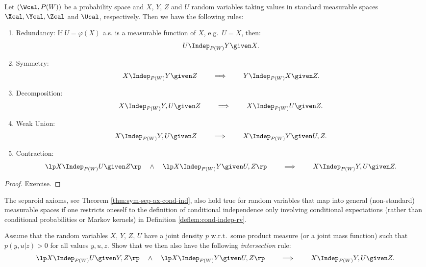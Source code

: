 \begin{Thm}
    \label{thm:sym-sep-ax-cond-ind}
  Let $(\Wcal,P(W))$ be a probability space and $X$, $Y$, $Z$ and $U$ random variables taking values in standard measurable spaces $\Xcal, \Ycal, \Zcal$ and $\Ucal$, respectively.
    Then we have the following rules:
    \begin{enumerate}
        \item Redundancy: If $U= \varphi(X)$ a.s. is a measurable function of $X$, e.g.\ $U=X$, then:
            \[ U \Indep_{P(W)} Y \given X. \]
        \item Symmetry: 
            \[ X \Indep_{P(W)} Y \given Z \qquad \implies \qquad Y \Indep_{P(W)} X \given Z.\]
        \item Decomposition: 
            \[X \Indep_{P(W)} Y,U \given Z \qquad \implies \qquad X \Indep_{P(W)} U \given Z.\]
        \item Weak Union:
            \[X \Indep_{P(W)} Y,U \given Z \qquad \implies \qquad X \Indep_{P(W)} Y \given U, Z.\]
        \item Contraction:
            \[ \lp X \Indep_{P(W)} U \given Z  \rp \quad \land \quad \lp X \Indep_{P(W)} Y \given U,Z  \rp \qquad \implies \qquad X \Indep_{P(W)} Y,U \given Z.  \]
    \end{enumerate}
    \begin{proof}
        Exercise. 
    \end{proof}
\end{Thm}

\begin{Rem}
    The separoid axioms, see Theorem \ref{thm:sym-sep-ax-cond-ind}, also hold true for random variables that map into general (non-standard) measurable spaces if 
    one restricts oneself to the definition of conditional independence only involving conditional expectations (rather than conditional probabilities or Markov kernels) in Definition \ref{deflem:cond-indep-rv}.
\end{Rem}

\begin{Exc}
    Assume that the random variables $X$, $Y$, $Z$, $U$ have a joint density $p$ w.r.t.\ some product measure (or a joint mass function)
    such that $p(y,u|z) > 0$ for all values $y,u,z$. Show that we then also have the following \emph{intersection} rule:
            \[ \lp X \Indep_{P(W)} U \given Y,Z  \rp \quad \land \quad \lp X \Indep_{P(W)} Y \given U,Z  \rp \qquad \implies \qquad X \Indep_{P(W)} Y,U \given Z.  \]

\end{Exc}


